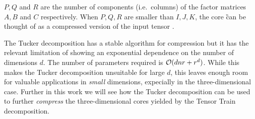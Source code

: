 $P, Q$ and $R$ are the number of components (i.e.\ columns) of the factor matrices $A, B$ and $C$ respectively. When $P,Q,R$ are smaller than $I,J,K$, the core \G can be thought of as a compressed version of the input tensor \X.

The Tucker decomposition has a stable algorithm for compression but it has the relevant limitation of showing an exponential dependence on the number of dimensions $d$. The number of parameters required is $\mathcal{O}(dnr+r^d)$.
While this makes the Tucker decomposition unsuitable for large $d$, this leaves enough room for valuable applications in \emph{small} dimensions, expecially in the three-dimensional case. Further in this work we will see how the Tucker decomposition can be used to further \emph{compress} the three-dimensional cores yielded by the Tensor Train decomposition.
